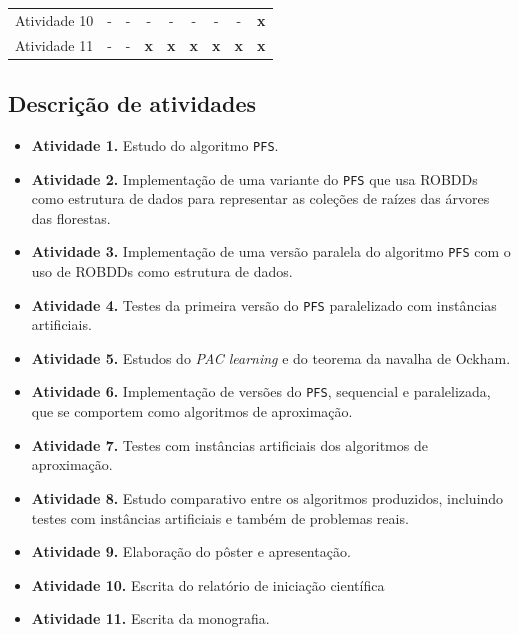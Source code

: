\documentclass[12pt]{article}
\begin{document}
\begin{table}[!ht]
\begin{center}
\begin{tabular}{l cccccccc}
    \small Atividade 10
    & \small - & \small - & \small - & \small - & \small -  
    & \small - & \small - & \small {\bf x} \\

    \small Atividade 11
    & \small - & \small - & \small {\bf x} & \small {\bf x} 
    & \small {\bf x}  & \small {\bf x} & \small {\bf x}
    & \small {\bf x} \\



    \bottomrule
\end{tabular}
\end{center}
\end{table}

\subsection{Descrição de atividades} \label{sec:atividades}
\begin{itemize}
    \item{\bf Atividade 1.}
        Estudo do algoritmo {\tt PFS}.
    \item{\bf Atividade 2.}
        Implementação de uma variante do {\tt PFS} que usa ROBDDs como 
        estrutura de dados para representar as coleções de raízes das 
        árvores das florestas.
    \item{\bf Atividade 3.}
        Implementação de uma versão paralela do algoritmo {\tt PFS} com
        o uso de ROBDDs como estrutura de dados.
    \item{\bf Atividade 4.}
        Testes da primeira versão do {\tt PFS} paralelizado com 
        instâncias artificiais.
    \item{\bf Atividade 5.}
        Estudos do {\em PAC learning} e do teorema da navalha de Ockham.
    \item{\bf Atividade 6.}
        Implementação de versões do {\tt PFS}, sequencial e 
        paralelizada, que se comportem como algoritmos de aproximação.
    \item{\bf Atividade 7.} 
        Testes com instâncias artificiais dos algoritmos de aproximação.
    \item{\bf Atividade 8.}
        Estudo comparativo entre os algoritmos produzidos, incluindo 
        testes com instâncias artificiais e também de problemas reais.
    \item{\bf Atividade 9.}
        Elaboração do pôster e apresentação.
    \item{\bf Atividade 10.}
        Escrita do relatório de iniciação científica
    \item{\bf Atividade 11.}
        Escrita da monografia.
    \end{itemize}
\end{document}
